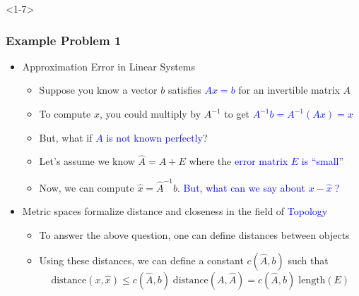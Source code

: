 \documentclass[10pt,english,aspectratio=169]{beamer}
\newcommand{\vecnot}[1]{#1}
\begin{document}
\begin{frame}<1-7> \frametitle{Example Problem 1}

\begin{itemize}
\item<1-> Approximation Error in Linear Systems \vspace{1mm}

\begin{itemize}
  \setlength\itemsep{3mm}
  \item<1-> Suppose you know a vector $\vecnot{b}$ satisfies \textcolor{blue}{$A \vecnot{x} = \vecnot{b}$} for an invertible matrix $A$
  
  \item<2-> To compute $\vecnot{x}$, you could multiply by $A^{-1}$ to get \textcolor{blue}{$A^{-1} \vecnot{b} = A^{-1} (A \vecnot{x}) = \vecnot{x}\!\!\!\!\!\!\!\!\!$}
  
  \item<3-> But, what if \textcolor{blue}{$A$ is not known perfectly}?
  
  \item<4-> Let's assume we know $\hat{A} = A + E$ where the \textcolor{blue}{error matrix $E$ is ``small''}
  
  \item<5-> Now, we can compute $\hat{\vecnot{x}} = \hat{A}^{-1} \vecnot{b}$. \textcolor{blue}{But, what can we say about $\vecnot{x}-\hat{\vecnot{x}}\;$?} \vspace{3mm}

\end{itemize}

\item <6-> Metric spaces formalize distance and closeness in the field of \textcolor{blue}{Topology} \vspace{1mm}

\begin{itemize}
  \setlength\itemsep{3mm}
  \item<6-> To answer the above question, one can define distances between objects
  \item<7-> Using these distances, we can define a constant $c(\hat{A},\vecnot{b})$ such that
  \[ \text{distance}(\vecnot{x},\hat{\vecnot{x}}) \leq c(\hat{A},\vecnot{b}) \; \text{distance}(A,\hat{A}) = c(\hat{A},\vecnot{b}) \; \text{length}(E)  \]
\end{itemize}
  
\end{itemize}


\end{frame}
\end{document}
